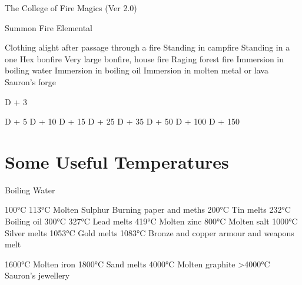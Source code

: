 \begin{Chapter}{The College of Fire Magics (Ver 2.0)}
\begin{ritual}[R-4]{Summon Fire Elemental }
\begin{effects}
Clothing alight after passage through 
a fire 
Standing in campfire 
Standing in a one Hex bonfire 
Very large bonfire, house fire 
Raging forest fire 
Immersion in boiling water 
Immersion in boiling oil 
Immersion in molten metal or lava 
Sauron’s forge 

D + 3 

D + 5 
D + 10 
D + 15 
D + 25 
D + 35 
D + 50 
D + 100 
D + 150 


\end{effects}
\end{ritual}

\section{Some Useful Temperatures}

Boiling Water 

100°C 
113°C  Molten Sulphur 
Burning paper and meths 
200°C 
Tin melts 
232°C 
Boiling oil 
300°C 
327°C 
Lead melts 
419°C  Molten zinc 
800°C  Molten salt 
1000°C  Silver melts 
1053°C  Gold melts 
1083°C  Bronze and copper armour and weapons melt 

1600°C  Molten iron 
1800°C  Sand melts 
4000°C  Molten graphite 
>4000°C  Sauron’s jewellery 
 

 


\end{Chapter}
